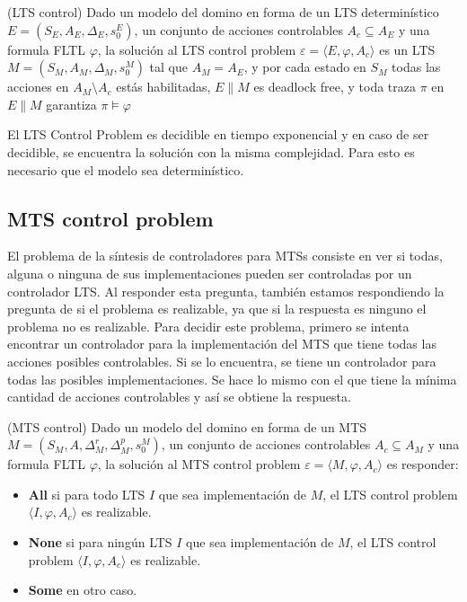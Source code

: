 \begin{definition}{(LTS control)}
Dado un modelo del domino en forma de un LTS determinístico $E = (S_{E}, A_{E}, \Delta_{E}, s_{0}^{E})$, un conjunto de
acciones controlables $A_{c} \subseteq A_{E}$ y una formula FLTL $\varphi$, la solución al LTS control problem
$\varepsilon = \langle E, \varphi, A_{c} \rangle$ es un LTS $M = (S_{M}, A_{M}, \Delta_{M}, s_{0}^{M})$ tal que
$A_{M} = A_{E}$, y por cada estado en $S_{M}$ todas las acciones en $A_{M} \setminus A_{c}$ estás habilitadas, $E \parallel M$
es deadlock free, y toda traza $\pi$ en $E \parallel M$ garantiza $\pi \vDash \varphi$
\end{definition}

El LTS Control Problem es decidible en tiempo exponencial y en caso de ser decidible, se encuentra la solución con la
misma complejidad. Para esto es necesario que el modelo sea determinístico.

\subsection{MTS	control problem}

El problema de la síntesis de controladores para MTSs \cite{MTSControl} consiste en ver si todas, alguna o ninguna de sus implementaciones
pueden ser controladas por un controlador LTS. Al responder esta pregunta, también estamos respondiendo la pregunta de
si el problema es realizable, ya que si la respuesta es ninguno el problema no es realizable. Para decidir este problema,
primero se intenta encontrar un controlador para la implementación del MTS que tiene todas las acciones posibles controlables.
Si se lo encuentra, se tiene un controlador para todas las posibles implementaciones. Se hace lo mismo con el que tiene la
mínima cantidad de acciones controlables y así se obtiene la respuesta.

\begin{definition}{(MTS control)}
Dado un modelo del domino en forma de un MTS $M = (S_{M}, A, \Delta_{M}^{r}, \Delta_{M}^{p}, s_{0}^{M})$, un conjunto de
acciones controlables $A_{c} \subseteq A_{M}$ y una formula FLTL $\varphi$, la solución al MTS control problem
$\varepsilon = \langle M, \varphi, A_{c} \rangle$ es responder:

\begin{itemize}

\item
\textbf{All} si para todo LTS $I$ que sea implementación de $M$, el LTS control problem $\langle I, \varphi, A_{c} \rangle$ es realizable.

\item
\textbf{None} si para ningún LTS $I$ que sea implementación de $M$, el LTS control problem $\langle I, \varphi, A_{c} \rangle$ es realizable.

\item
\textbf{Some} en otro caso.

\end{itemize}

\end{definition}